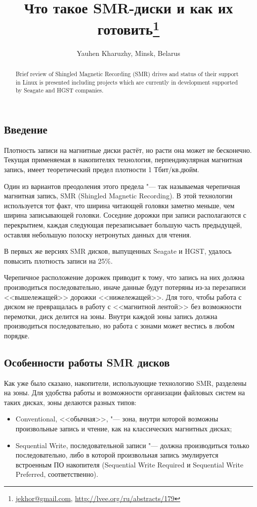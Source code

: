\documentclass[10pt, a5paper]{article}
\begin{document}
\title{Что такое SMR-диски и как их готовить\footnote{\url{jekhor@gmail.com}, \url{http://lvee.org/ru/abstracts/179}}}
\author{Yauhen Kharuzhy, Minsk, Belarus}
\maketitle
\begin{abstract}
Brief review of Shingled Magnetic Recording (SMR) drives and status of their support in Linux is presented including projects which are currently in development supported by Seagate and HGST companies.
\end{abstract}
\subsection*{Введение}

Плотность записи на магнитные диски растёт, но расти она может не бесконечно. Текущая применяемая в накопителях технология, перпендикулярная магнитная запись, имеет теоретический предел плотности 1 Тбит/кв.дюйм.

Один из вариантов преодоления этого предела "--- так называемая черепичная магнитная запись, SMR (Shingled Magnetic \linebreak Recording). В этой технологии используется тот факт, что ширина читающей головки заметно меньше, чем ширина записывающей головки. Соседние дорожки при записи располагаются с перекрытием, каждая следующая перезаписывает большую часть предыдущей, оставляя небольшую полоску нетронутых данных для чтения.

В первых же версиях SMR дисков, выпущенных Seagate и HGST, удалось повысить плотность записи на 25\%.

Черепичное расположение дорожек приводит к тому, что запись на них должна производиться последовательно, иначе данные будут потеряны из-за перезаписи <<вышележащей>> дорожки <<нижележащей>>. Для того, чтобы работа с диском не превращалась в работу с <<магнитной лентой>> без возможности перемотки, диск делится на зоны. Внутри каждой зоны запись должна производиться последовательно, но работа с зонами может вестись в любом порядке.

\subsection*{Особенности работы SMR дисков}

Как уже было сказано, накопители, использующие технологию SMR, разделены на зоны. Для удобства работы и возможности организации файловых систем на таких дисках, зоны делаются разных типов:
\begin{itemize}
  \item Conventional, <<обычная>>, "--- зона, внутри которой возможны произвольные запись и чтение, как на классических магнитных дисках;
  \item Sequential Write, последовательной записи "--- должна производиться только последовательно, либо в которой произвольная запись эмулируется встроенным ПО накопителя (Sequential Write Required и Sequential Write Preferred, соответственно).
\end{itemize}
\end{document}
